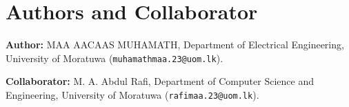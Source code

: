 \documentclass[conference]{IEEEtran}
\begin{document}



\noindent\begin{minipage}{\columnwidth}
\section*{Authors and Collaborator}
\textbf{Author:} MAA AACAAS MUHAMATH, Department of Electrical Engineering,
University of Moratuwa (\texttt{muhamathmaa.23@uom.lk}).

\textbf{Collaborator:} M. A. Abdul Rafi, Department of Computer Science and
Engineering, University of Moratuwa (\texttt{rafimaa.23@uom.lk}).
\end{minipage}
\end{document}
